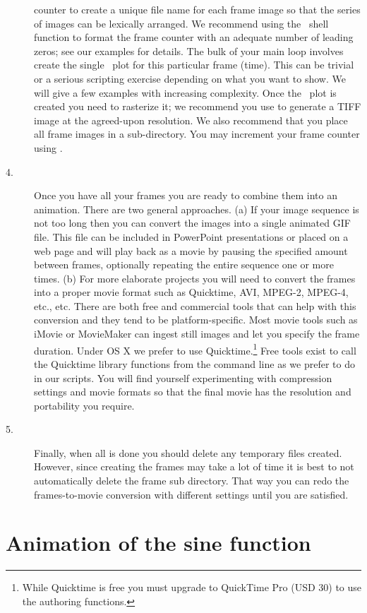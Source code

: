 \begin{description}
counter to create a unique file name for each frame image so that the series of
images can be lexically arranged.  We recommend using the \GMT\ shell function
 to format the frame counter
with an adequate number of leading zeros; see our examples for details.  The
bulk of your main loop involves create the single \PS\ plot for this particular
frame (time).  This can be trivial or a serious scripting exercise depending on
what you want to show.  We will give a few examples with increasing complexity.
Once the \PS\ plot is created you need to rasterize it; we recommend you use
 to generate a TIFF image at the agreed-upon resolution.
We also recommend that you place all frame images in a sub-directory. You may increment
your frame counter using .
\item [4.] Once you have all your frames you are ready to combine them into an animation.
There are two general approaches. (a) If your image sequence is not too long then
you can convert the images into a single animated GIF file.  This file can be
included in PowerPoint presentations or placed on a web page and will play back
as a movie by pausing the specified amount between frames, optionally repeating
the entire sequence one or more times. (b) For more elaborate projects
you will need to convert the frames into a proper movie format such as Quicktime,
AVI, MPEG-2, MPEG-4, etc., etc.  There are both free and commercial tools that
can help with this conversion and they tend to be platform-specific.  Most movie
tools such as iMovie or MovieMaker can ingest still images and let you specify
the frame duration.  Under OS X we prefer to use Quicktime.\footnote{While Quicktime
is free you must upgrade to QuickTime Pro (USD 30) to use the authoring functions.}  Free
tools exist to call the Quicktime library functions from the command line as we
prefer to do in our scripts.  You will find yourself experimenting with compression
settings and movie formats so that the final movie has the resolution and portability
you require.
\item [5.]  Finally, when all is done you should delete any temporary files created.
However, since creating the frames may take a lot of time it is best to not automatically
delete the frame sub directory.  That way you can
redo the frames-to-movie conversion with different settings until you are satisfied.
\end{description}

\section{Animation of the sine function}

